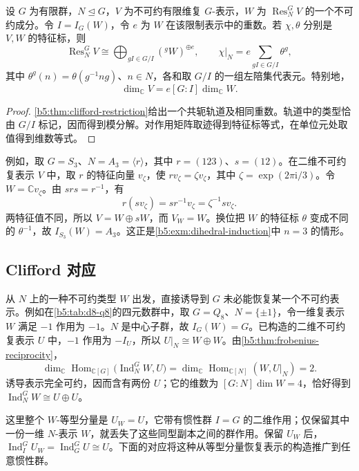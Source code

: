 \begin{corollary}\label{b5:cor:clifford-character}
	设 \(G\) 为有限群，\(N\trianglelefteq G\)，\(V\) 为不可约有限维复 \(G\)-表示，\(W\) 为 \(\operatorname{Res}_N^G V\) 的一个不可约成分。令 \(I=I_G(W)\)，令 \(e\) 为 \(W\) 在该限制表示中的重数。若 \(\chi,\theta\) 分别是 \(V,W\) 的特征标，则
	\[
		\operatorname{Res}_N^G V\cong \bigoplus_{gI\in G/I}({}^gW)^{\oplus e}, \qquad \chi|_N=e\sum_{gI\in G/I}\theta^g,
	\]
	其中 \(\theta^g(n)=\theta(g^{-1}ng)\)、\(n\in N\)，各和取 \(G/I\) 的一组左陪集代表元。特别地，
	\[
		\dim_{\mathbb C}V=e[G:I]\dim_{\mathbb C}W.
	\]
\end{corollary}
\begin{proof}
	\cref{b5:thm:clifford-restriction}给出一个共轭轨道及相同重数。轨道中的类型恰由 \(G/I\) 标记，因而得到模分解。对作用矩阵取迹得到特征标等式，在单位元处取值得到维数等式。
\end{proof}

例如，取 \(G=S_3\)、\(N=A_3=\langle r\rangle\)，其中 \(r=(123)\)、\(s=(12)\)。在二维不可约复表示 \(V\) 中，取 \(r\) 的特征向量 \(v_\zeta\)，使 \(rv_\zeta=\zeta v_\zeta\)，其中 \(\zeta=\exp(2\pi\mathrm i/3)\)。令 \(W=\mathbb Cv_\zeta\)。由 \(srs=r^{-1}\)，有
\[
	r(sv_\zeta)=sr^{-1}v_\zeta=\zeta^{-1}sv_\zeta.
\]
两特征值不同，所以 \(V=W\oplus sW\)，而 \(V_W=W\)。换位把 \(W\) 的特征标 \(\theta\) 变成不同的 \(\theta^{-1}\)，故 \(I_{S_3}(W)=A_3\)。这正是\cref{b5:exm:dihedral-induction}中 \(n=3\) 的情形。

\subsection{Clifford 对应}
\label{b5:subsec:0403:03}

从 \(N\) 上的一种不可约类型 \(W\) 出发，直接诱导到 \(G\) 未必能恢复某一个不可约表示。例如在\cref{b5:tab:d8-q8}的四元数群中，取 \(G=Q_8\)、\(N=\{\pm1\}\)，令一维复表示 \(W\) 满足 \(-1\) 作用为 \(-1\)。\(N\) 是中心子群，故 \(I_G(W)=G\)。已构造的二维不可约复表示 \(U\) 中，\(-1\) 作用为 \(-I_U\)，所以 \(U|_N\cong W\oplus W\)。由\cref{b5:thm:frobenius-reciprocity}，
\[
	\dim_{\mathbb C}\operatorname{Hom}_{\mathbb C[G]} \bigl(\operatorname{Ind}_N^G W,U\bigr) =\dim_{\mathbb C}\operatorname{Hom}_{\mathbb C[N]}(W,U|_N)=2.
\]
诱导表示完全可约，因而含有两份 \(U\)；它的维数为 \([G:N]\dim W=4\)，恰好得到 \(\operatorname{Ind}_N^G W\cong U\oplus U\)。

\ProseParagraphBreak
这里整个 \(W\)-等型分量是 \(U_W=U\)，它带有惯性群 \(I=G\) 的二维作用；仅保留其中一份一维 \(N\)-表示 \(W\)，就丢失了这些同型副本之间的群作用。保留 \(U_W\) 后，\(\operatorname{Ind}_I^G U_W=\operatorname{Ind}_G^G U\cong U\)。下面的对应将这种从等型分量恢复表示的构造推广到任意惯性群。

